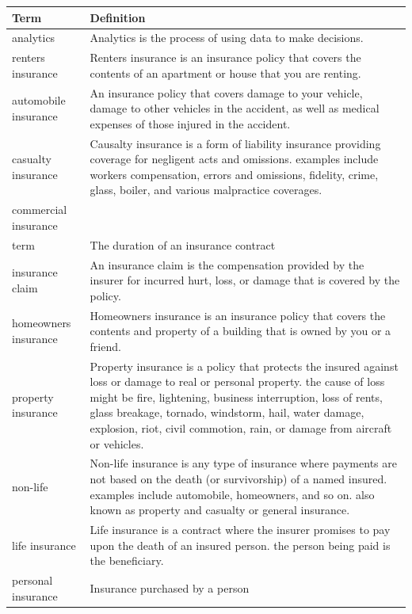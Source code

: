 \documentclass[
]{book}
\begin{document}
\begin{longtable}{>{\raggedright\arraybackslash}p{10em}|>{\raggedright\arraybackslash}p{30em}}
\hline
Term & Definition\\
\hline
analytics & Analytics is the process of using data to make decisions.\\
\hline
renters insurance & Renters insurance is an insurance policy that covers the contents of an apartment or house that you are renting.\\
\hline
automobile insurance & An insurance policy that covers damage to your vehicle, damage to other vehicles in the accident, as well as medical expenses of those injured in the accident.\\
\hline
casualty insurance & Causalty insurance is a form of liability insurance providing coverage for negligent acts and omissions. examples include workers compensation, errors and omissions, fidelity, crime, glass, boiler, and various malpractice coverages.\\
\hline
commercial insurance & \\
\hline
term & The duration of an insurance contract\\
\hline
insurance claim & An insurance claim is the compensation provided by the insurer for incurred hurt, loss, or damage that is covered by the policy.\\
\hline
homeowners insurance & Homeowners insurance is an insurance policy that covers the contents and property of a building that is owned by you or a friend.\\
\hline
property insurance & Property insurance is a policy that protects the insured against loss or damage to real or personal property. the cause of loss might be  fire, lightening, business interruption, loss of rents, glass breakage, tornado, windstorm, hail, water damage, explosion, riot, civil commotion, rain, or damage from aircraft or vehicles.\\
\hline
non-life & Non-life insurance is any type of insurance where payments are not based on the death (or survivorship) of a named insured. examples include automobile, homeowners, and so on. also known as property and casualty or general insurance.\\
\hline
life insurance & Life insurance is a contract where the insurer promises to pay upon the death of an insured person. the person being paid is the beneficiary.\\
\hline
personal insurance & Insurance purchased by a person\\

\end{longtable}
\end{document}
